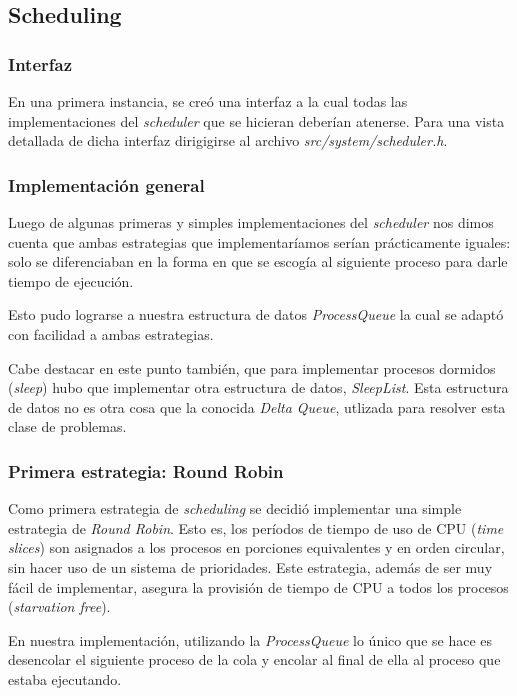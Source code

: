 \documentclass[a4paper,10pt]{article}
\begin{document}
    \subsection{Scheduling}
        
        \subsubsection{Interfaz}
        En una primera instancia, se creó una interfaz a la cual todas las implementaciones del \textit{scheduler} que se hicieran
	deberían atenerse. Para una vista detallada de dicha interfaz dirigigirse al archivo \textit{src/system/scheduler.h}.

        \subsubsection{Implementación general}
	Luego de algunas primeras y simples implementaciones del \textit{scheduler} nos dimos cuenta que ambas estrategias que 
	implementaríamos serían prácticamente iguales: solo se diferenciaban en la forma en que se escogía al siguiente proceso
	para darle tiempo de ejecución. 

	Esto pudo lograrse a nuestra estructura de datos \textit{ProcessQueue} la cual se adaptó con facilidad a ambas estrategias.

	Cabe destacar en este punto también, que para implementar procesos dormidos (\textit{sleep}) hubo que implementar otra estructura
	de datos, \textit{SleepList}. Esta estructura de datos no es otra cosa que la conocida \textit{Delta Queue}, utlizada para resolver 
	esta clase de problemas.

        \subsubsection{Primera estrategia: Round Robin}
        Como primera estrategia de \textit{scheduling} se decidió implementar una simple estrategia de \textit{Round Robin}.
        Esto es, los períodos de tiempo de uso de CPU (\textit{time slices}) son asignados a los procesos en porciones 
        equivalentes y en orden circular, sin hacer uso de un sistema de prioridades. Este estrategia, además de ser muy 
        fácil de implementar, asegura la provisión de tiempo de CPU a todos los procesos (\textit{starvation free}).

	En nuestra implementación, utilizando la \textit{ProcessQueue} lo único que se hace es desencolar el siguiente proceso 
	de la cola y encolar al final de ella al proceso que estaba ejecutando.
\end{document}
